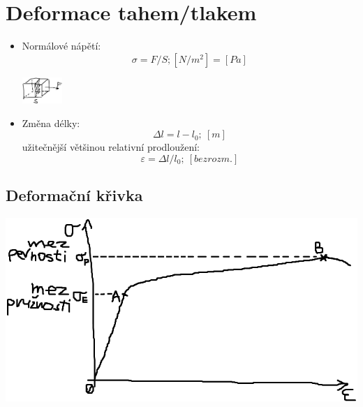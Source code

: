 \documentclass{article}
\begin{document}
  \section{Deformace tahem/tlakem}

    \begin{itemize}
      \item Normálové nápětí:
      	\begin{equation*}
          \sigma=F/S; [N/m^2] = [Pa]
        \end{equation*}
        \begin{center}
          \vspace{-0.25cm}\includegraphics[width=0.12\textwidth]{normalove_napeti}\vspace{-0.25cm}
        \end{center}
      \item Změna délky:
        \begin{equation*}
          \Delta l = l - l_0; \ [m]
        \end{equation*}
      užitečnější většinou relativní prodloužení:
        \begin{equation*}
          \varepsilon = \Delta l/l_0; \ [bezrozm.]
        \end{equation*}
    \end{itemize}

    \subsection{Deformační křivka}
      \begin{center}
        \vspace{-0.1cm}\includegraphics[width=0.75\linewidth]{deformacni_krivka}\vspace{-0.25cm}
      \end{center}
\end{document}
